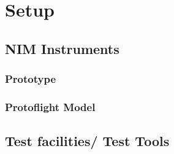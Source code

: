 \section{Setup}\label{sec:setup}
	\begin{comment}
	The goal of this chapter is to show NIM in the current lab equipment. An 'as is' state.
	Instrument in vacuum chamber. Mechanical description. Theoretical description is in the theory part.
	IS based on the design of Abplanalp 2009 if so. Look it up for NIM.
	With which IS, reflectron, detector. Short description of the different parts as they were for the first tests. (IS, reflectron, detector type). With pictures.
	Lab electronics, cabling? Or just reference to Stefan's Diss? Used standard settings such a pulser timings, UMCP, filament emission current, chamber pressure.
	(will also be mentioned in chamber experiments for the different settings)
	
	\end{comment}
	
	\subsection{NIM Instruments}\label{subsec:setupInst}
		\subsubsection{Prototype}
		\begin{comment}
		IS with 8 lenses and one filament holder (flight 7 lenses, 2 filament holders)
		small antechamber with edge, one entrance hole at 90° (fight 80mm diam., 2 holes at +-60° relative to normal)
		Prototype reflectron with ring electrodes (flight has 3 electrodes with a linear increasing resistance in between them)
		Pulser: lab pulser (flight still under development -> tests later)
		\end{comment}
		
		\subsubsection{Protoflight Model}
	
	\subsection{Test facilities/ Test Tools}\label{subsec:setupTestTools} %
	

